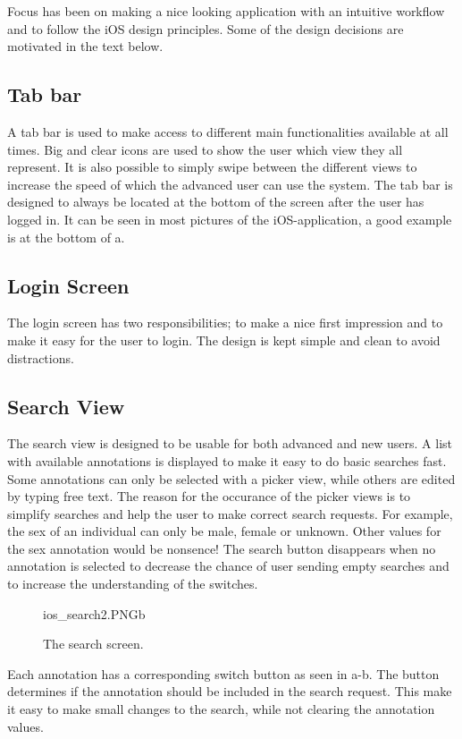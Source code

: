 Focus has been on making a nice looking application with an intuitive workflow and to follow the iOS design principles. Some of the design decisions are motivated in the text below.

\subsection{Tab bar}
A tab bar is used to make access to different main functionalities available at all times. Big and clear icons are used to show the user which view they all represent. It is also possible to simply swipe between the different views to increase the speed of which the advanced user can use the system. The tab bar is designed to always be located at the bottom of the screen after the user has logged in. It can be seen in most pictures of the iOS-application, a good example is at the bottom of a.

\subsection{Login Screen}
The login screen has two responsibilities; to make a nice first impression and to make it easy for the user to login. The design is kept simple and clean to avoid distractions.

\subsection{Search View}
The search view is designed to be usable for both advanced and new users. A list with available annotations is displayed to make it easy to do basic searches fast. Some annotations can only be selected with a picker view, while others are edited by typing free text. The reason for the occurance of the picker views is to simplify searches and help the user to make correct search requests. For example, the sex of an individual can only be male, female or unknown. Other values for the sex annotation would be nonsence! The search button disappears when no annotation is selected to decrease the chance of user sending empty searches and to increase the understanding of the switches. 

\begin{figure}[ht]
		{ios_search2.PNG}{b}
\caption{The search screen.}
\label{fig:ios_search2}
\end{figure}
\FloatBarrier

Each annotation has a corresponding switch button as seen in a-b. The button determines if the annotation should be included in the search request. This make it easy to make small changes to the search, while not clearing the annotation values.

